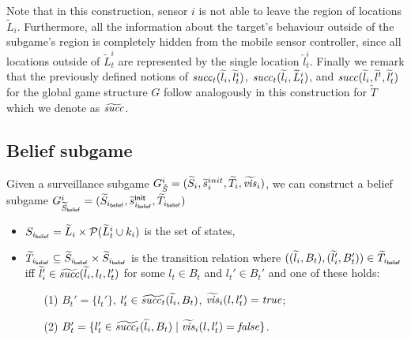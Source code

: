 Note that in this construction, sensor $i$ is not able to leave the region of locations $\widetilde{L}_i$. Furthermore, all the information about the target's behaviour outside of  the subgame's region is completely hidden from the mobile sensor controller, since all locations outside of  $\widetilde{L}_t^i$ are represented by the single location $\hat{l}_t^i$.
Finally we remark that the previously defined notions of $\mathit{succ}_t(\widetilde{l}_i,\widetilde{l}^i_{t})$, $\mathit{succ}_t(\widetilde{l}_i,\widetilde{L}^i_{t})$, and $\mathit{succ}(\widetilde{l}_i,\widetilde{l}^{t},\widetilde{l}_{t}')$ for the global game structure $G$ follow analogously in this construction for $\widetilde{T}$ which we denote as $\widetilde{\mathit{succ}}$.

\subsection{Belief subgame}
Given a surveillance subgame $G^{i}_{\tilde{S}} = (\widetilde{S}_i,\widetilde{s}_i^{init},\widetilde{T}_i,\widetilde{\mathit{vis}}_i)$, we can construct a belief subgame $G^{i}_{\widetilde{S}_{\mathsf{belief}}} = (\widetilde{S}_{i_{\mathsf{belief}}},\widetilde{s}^{\mathsf{init}}_{i_{\mathsf{belief}}},\widetilde{T}_{i_{\mathsf{belief}}})$ 

\begin{itemize}
\item $S_{i_{\mathsf{belief}}} = \widetilde{L}_i \times \mathcal{P}(\widetilde{L}^i_t \cup k_i)$ is the set of states,
\item $\widetilde{T}_{i_{\mathsf{belief}}} \subseteq \widetilde{S}_{i_{\mathsf{belief}}} \times \widetilde{S}_{i_{\mathsf{belief}}}$ is the transition relation where $((\widetilde{l}_i, B_t),(\widetilde{l}_i', B_t')) \in \widetilde{T}_{i_{\mathsf{belief}}}$ iff $\widetilde{l}_i' \in  \widetilde{\mathit{succ}}(\widetilde{l}_i,l_t,l_t')$ for some $l_t \in B_t$ and $l_t' \in B_t'$ and one of these holds:
\begin{itemize}
\item[(1)] $B_t' = \{l_t'\}$, $l_t' \in \widetilde{\mathit{succ}_t}(\widetilde{l}_i,B_t)$, $\widetilde{\mathit{vis}}_i(l,l_t') = \mathit{true}$;
\item[(2)] $B_t' = \{l_t' \in \widetilde{\mathit{succ}_t}(\widetilde{l}_i,B_t)  \mid  \widetilde{\mathit{vis}}_i(l,l_t') = \mathit{false} \}$.
\end{itemize}
\end{itemize}

